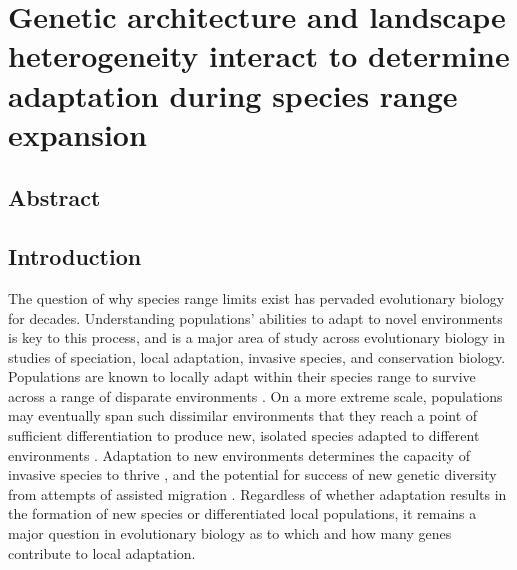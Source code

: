 \chapter{Genetic architecture and landscape heterogeneity interact to determine adaptation during species range expansion}%
\label{chap:heterogeneouslandscapes}

\section{Abstract}


\section{Introduction}





The question of why species range limits exist has pervaded evolutionary biology for decades. Understanding populations' abilities to adapt to novel environments is key to this process, and is a major area of study across evolutionary biology in studies of speciation, local adaptation, invasive species, and conservation biology. 
Populations are known to locally adapt within their species range to survive across a range of disparate environments \citep{Kawecki:2004}. On a more extreme scale, populations may eventually span such dissimilar environments that they reach a point of sufficient differentiation to produce new, isolated species adapted to different environments \citep{Rundle:2005, Doebeli:2003}. Adaptation to new environments determines the capacity of invasive species to thrive \citep{Prentis:2008}, and the potential for success of new genetic diversity from attempts of assisted migration \citep{Aitken:2013}. 
Regardless of whether adaptation results in the formation of new species or differentiated local populations, it remains a major question in evolutionary biology as to which and how many genes contribute to local adaptation. 

